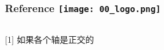 \begin{comment}
\end{comment}
\begin{frame}
\frametitle{Reference \hfill \texttt{[image: 00\_logo.png]}}
\begin{columns}
  
	[1] 如果各个轴是正交的
  
  

\end{columns}
\end{frame}

